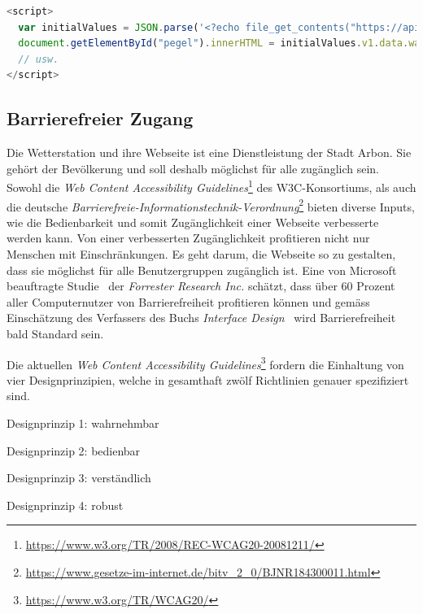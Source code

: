 \begin{lstlisting}[label=lst:initialValues,caption=Übergabe der Initialisierungswerte durch php, language=JavaScript, style=htmlcssjs]
<script>
  var initialValues = JSON.parse('<?echo file_get_contents("https://api.wetter-arbon.ch/v1/");?>');
  document.getElementById("pegel").innerHTML = initialValues.v1.data.waterlevel.value;
  // usw.
</script>

\end{lstlisting}

\subsection{Barrierefreier Zugang}
Die Wetterstation und ihre Webseite ist eine Dienstleistung der Stadt Arbon. Sie gehört der Bevölkerung und soll deshalb möglichst für alle zugänglich sein. Sowohl die \emph{Web Content Accessibility Guidelines}\footnote{ \url{https://www.w3.org/TR/2008/REC-WCAG20-20081211/}} des W3C-Konsortiums, als auch die deutsche \emph{Barrierefreie-Informationstechnik-Verordnung}\footnote{ \url{https://www.gesetze-im-internet.de/bitv_2_0/BJNR184300011.html}} bieten diverse Inputs, wie die Bedienbarkeit und somit Zugänglichkeit einer Webseite verbesserte werden kann. Von einer verbesserten Zugänglichkeit profitieren nicht nur Menschen mit Einschränkungen. Es geht darum, die Webseite so zu gestalten, dass sie möglichst für alle Benutzergruppen zugänglich ist. Eine von Microsoft beauftragte Studie~\cite{ForresterResearch2004E:Abilities} der \emph{Forrester Research Inc.} schätzt, dass über 60 Prozent aller Computernutzer von Barrierefreiheit profitieren können und gemäss Einschätzung des Verfassers des Buchs \emph{Interface Design}~\cite{ThesmannStephan2016ID:U} wird Barrierefreiheit bald Standard sein.

\noindent
Die aktuellen \emph{Web Content Accessibility Guidelines}\footnote{\url{https://www.w3.org/TR/WCAG20/}} fordern die Einhaltung von vier Designprinzipien, welche in gesamthaft zwölf Richtlinien genauer spezifiziert sind.

\begin{itemize*}
\item Designprinzip 1: wahrnehmbar
\item Designprinzip 2: bedienbar
\item Designprinzip 3: verständlich
\item Designprinzip 4: robust
\end{itemize*}

